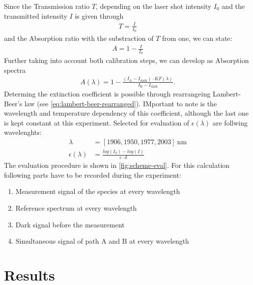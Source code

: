 Since the Transmission ratio $T$, depending on the laser shot intensity $I_\mathrm{0}$ and the transmitted intensity $I$ is given through 
\begin{align}
    T=\frac{I}{I_\mathrm{0}} \nonumber
\end{align}
and the Absorption ratio with the substraction of $T$ from one, we can state:
\begin{align}
    A=1-\frac{I}{I_\mathrm{0}} \nonumber
\end{align}
Further taking into account both calibration steps, we can develop as Absorption spectra
\begin{align}
    A(\lambda)=1-\frac{(I_\mathrm{A} - I_\mathrm{dark}) \cdot KF(\lambda)}{I_\mathrm{B} - I_\mathrm{dark}} \label{eq:absorption-spectrum}.
\end{align}
Determing the extinction coefficient is possible through rearrangeing Lambert-Beer's law (see \autoref{eq:lambert-beer-rearranged}). IMportant to note is the wavelength and temperature dependency of this coefficient, although the last one is kept constant at this experiment. Selected for evaluation of $\epsilon(\lambda)$ are follwing wavelenghts:
\begin{align}
    \lambda&=[1906, 1950, 1977, 2003]~\mathrm{nm} \nonumber \\[6pt]
    \epsilon(\lambda)&=\frac{log(I_\mathrm{0})-log(I)}{c \cdot d} \label{eq:lambert-beer-rearranged}
\end{align}
The evaluation procedure is shown in \autoref{fig:scheme-eval}. For this calculation following parts have to be recorded during the experiment:
\begin{enumerate}
    \item Measurement signal of the species at every wavelength
    \item Reference spectrum at every wavelength
    \item Dark signal before the measurement
    \item Simultaneous signal of path A and B at every wavelength
\end{enumerate}

\chapter{Results}
\label{chap:results}


